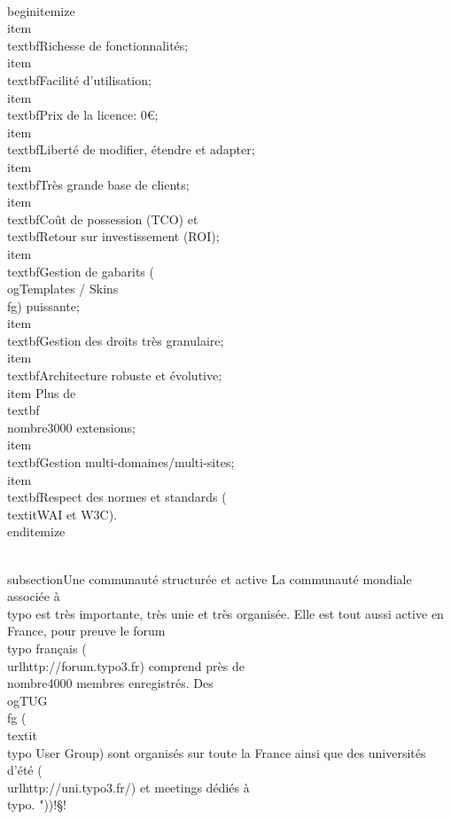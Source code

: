 \documentclass[]{extarticle}
\begin{document}
\\begin{itemize}
\\item \\textbf{Richesse} de fonctionnalités;
\\item \\textbf{Facilité} d'utilisation;
\\item \\textbf{Prix} de la licence: 0€;
\\item \\textbf{Liberté} de modifier, étendre et adapter;
\\item \\textbf{Très grande base de clients};
\\item \\textbf{Coût de possession} (TCO) et \\textbf{Retour sur investissement} (ROI);
\\item \\textbf{Gestion de gabarits} (\\og{}Templates / Skins\\fg{}) puissante;
\\item \\textbf{Gestion des droits} très granulaire;
\\item \\textbf{Architecture robuste et évolutive};
\\item Plus de \\textbf{\\nombre{3000} extensions};
\\item \\textbf{Gestion multi-domaines/multi-sites};
\\item \\textbf{Respect des normes} et standards (\\textit{WAI et W3C}).
\\end{itemize}

\\subsection{Une communauté structurée et active}
La communauté mondiale associée à \\typo est très importante, très unie et très
organisée. Elle est tout aussi active en France, pour preuve le forum \\typo
français (\\url{http://forum.typo3.fr})  comprend près de \\nombre{4000} membres
enregistrés. Des \\og{}TUG\\fg{} (\\textit{\\typo User Group}) sont organisés sur toute la
France ainsi que des universités d’été (\\url{http://uni.typo3.fr/}) et
meetings dédiés à \\typo.
"))!§!
\end{document}
